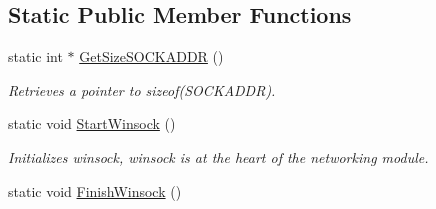 \subsection*{Static Public Member Functions}
\begin{DoxyCompactItemize}
\item 
static int $\ast$ \hyperlink{class_net_utility_a2509391f4fbcce2bfc8c77cb251fa53c}{GetSizeSOCKADDR} ()
\begin{DoxyCompactList}\small\item\em Retrieves a pointer to sizeof(SOCKADDR). \item\end{DoxyCompactList}\item 
\hypertarget{class_net_utility_a02950745d0116653291f28817b896386}{
static void \hyperlink{class_net_utility_a02950745d0116653291f28817b896386}{StartWinsock} ()}
\label{class_net_utility_a02950745d0116653291f28817b896386}

\begin{DoxyCompactList}\small\item\em Initializes winsock, winsock is at the heart of the networking module. \item\end{DoxyCompactList}\item 
\hypertarget{class_net_utility_a5363d3bf71a3ed70376e1eda0f02f47a}{
static void \hyperlink{class_net_utility_a5363d3bf71a3ed70376e1eda0f02f47a}{FinishWinsock} ()}
\label{class_net_utility_a5363d3bf71a3ed70376e1eda0f02f47a}


\end{DoxyCompactItemize}

